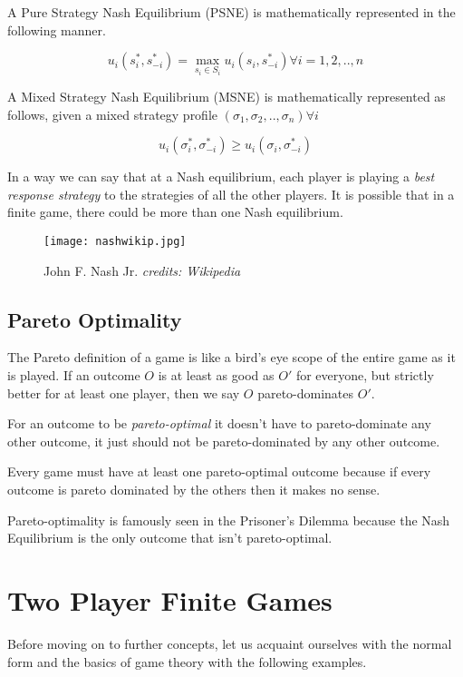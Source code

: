 \documentclass[11pt]{article}
\theoremstyle{definition}
\begin{document}
A Pure Strategy Nash Equilibrium (PSNE) is mathematically represented in the following manner.

\[
u_{i}(s_i^*, s_{-i}^*) = \max_{s_i \in S_i}u_i(s_i, s_{-i}^*) \forall i = 1, 2, .., n
\]

A Mixed Strategy Nash Equilibrium (MSNE) is mathematically represented as follows, given a mixed strategy profile $(\sigma_1, \sigma_2, .., \sigma_n) \forall i$

\[
u_i(\sigma_i^*, \sigma_{-i}^*) \geq u_i(\sigma_i, \sigma_{-i}^*)
\]

In a way we can say that at a Nash equilibrium, each player is playing a \textit{best response strategy} to the strategies of all the other players. It is possible that in a finite game, there could be more than one Nash equilibrium. 

\begin{figure}[h!]
\centering
\texttt{[image: nashwikip.jpg]}
\caption{John F. Nash Jr. \textit{credits: Wikipedia}}
\label{nashwikip}
\end{figure}

\subsection{Pareto Optimality}
The Pareto definition of a game is like a bird's eye scope of the entire game as it is played. If an outcome $O$ is at least as good as $O'$ for everyone, but strictly better for at least one player, then we say $O$ pareto-dominates $O'$.

	For an outcome to be \textit{pareto-optimal} it doesn't have to pareto-dominate any other outcome, it just should not be pareto-dominated by any other outcome.
	
	Every game must have at least one pareto-optimal outcome because if every outcome is pareto dominated by the others then it makes no sense.
	
	Pareto-optimality is famously seen in the Prisoner's Dilemma because the Nash Equilibrium is the only outcome that isn't pareto-optimal.

\newpage

\section{Two Player Finite Games}
Before moving on to further concepts, let us acquaint ourselves with the normal form and the basics of game theory with the following examples.
\end{document}
